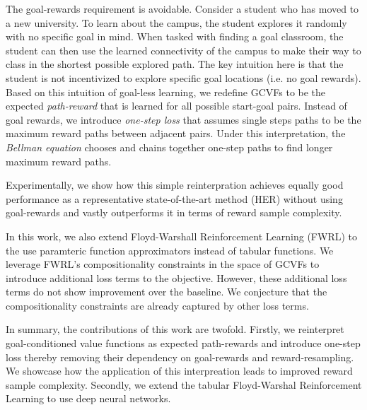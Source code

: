 The goal-rewards requirement is avoidable. Consider a
student who has moved to a new university. To learn about the campus,
the student explores it randomly with no specific goal in mind. When
tasked with finding a goal classroom, the student can then use the
learned connectivity of the campus to make their way to class in the
shortest possible explored path. The key intuition here is that the
student is not incentivized to explore specific goal locations (i.e. no
goal rewards). 
%
Based on this intuition of goal-less learning, we redefine GCVFs to be
the expected \emph{path-reward} that is learned for all possible
start-goal pairs. Instead of goal rewards, we  
introduce \emph{one-step loss} that assumes single steps paths 
to be the maximum reward paths between adjacent pairs.
Under this interpretation, the \emph{Bellman equation} chooses and chains
together one-step paths to find longer maximum reward paths. 

%
Experimentally, we show how this simple reinterpration achieves equally
good performance as a representative state-of-the-art method (HER)
without using goal-rewards and vastly outperforms it in terms of
reward sample complexity.

In this work, we also extend Floyd-Warshall Reinforcement
Learning (FWRL) \citep{dhiman2018floydwarshall} to the use paramteric
function approximators instead of tabular functions.  We leverage FWRL's
compositionality constraints in the space of GCVFs to introduce
additional loss terms to the objective. However, these additional loss
terms do not show improvement over the baseline. We conjecture that the
compositionality constraints are already captured by other loss terms. 

In summary, the  contributions of this work are twofold. Firstly, we
reinterpret goal-conditioned value functions as expected path-rewards
and introduce one-step loss thereby removing their dependency on
goal-rewards and reward-resampling. We showcase how the
application of this interpreation leads to improved reward sample complexity.
Secondly, we extend the tabular Floyd-Warshal Reinforcement Learning to
use deep neural networks.


